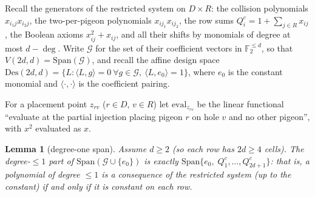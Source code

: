 \documentclass[11pt]{article}
\newtheorem{lemma}[theorem]{Lemma}
\theoremstyle{definition}
\theoremstyle{remark}
\newcommand{\F}{\mathbb{F}}
\newcommand{\Des}{\mathrm{Des}}
\newcommand{\Sp}{\mathrm{Span}}
\begin{document}
Recall the generators of the restricted system on $D\times R$: the
collision polynomials $x_{i_1j}x_{i_2j}$, the two-per-pigeon polynomials
$x_{ij_1}x_{ij_2}$, the row sums $Q^{c}_{i}=1+\sum_{j\in R}x_{ij}$, the
Boolean axioms $x_{ij}^2+x_{ij}$, and all their shifts by monomials of
degree at most $d-\deg$.  Write
$\mathcal{G}$ for the set of their coefficient vectors in
$\F_2^{\le d}$, so that $V(2d,d)=\Sp(\mathcal{G})$, and recall the
affine design space $\Des(2d,d)=\{L:\langle L,g\rangle=0\ \forall
g\in\mathcal{G},\ \langle L,e_0\rangle=1\}$, where $e_0$ is the constant
monomial and $\langle\cdot,\cdot\rangle$ is the coefficient pairing.

For a placement point $z_{rv}$ ($r\in D$, $v\in R$) let
$\mathrm{eval}_{z_{rv}}$ be the linear functional ``evaluate at the
partial injection placing pigeon $r$ on hole $v$ and no other pigeon'',
with $x^2$ evaluated as $x$.

\begin{lemma}[degree-one span]\label{lem:degonespan}
Assume $d\ge2$ (so each row has $2d\ge4$ cells).  The degree-$\le1$ part
of $\Sp(\mathcal{G}\cup\{e_0\})$ is exactly
$\Sp\{e_0,\;Q^{c}_1,\dots,Q^{c}_{2d+1}\}$: that is, a polynomial of
degree $\le1$ is a consequence of the restricted system (up to the
constant) if and only if it is constant on each row.
\end{lemma}
\end{document}
